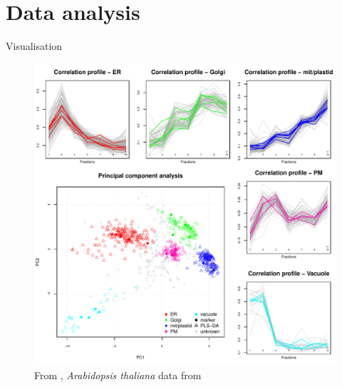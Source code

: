 \documentclass{beamer}
\theoremstyle{example}
\begin{document}

\section{Data analysis}


\begin{frame}{Visualisation}
  \begin{figure}
    \centering
    \includegraphics[width=.6\linewidth]{figs/F04-analyses.pdf}
    \caption{From \cite{Gatto:2010}, \textit{Arabidopsis thaliana} data
      from \cite{Dunkley:2006}}
  \end{figure}
\end{frame}
\end{document}
